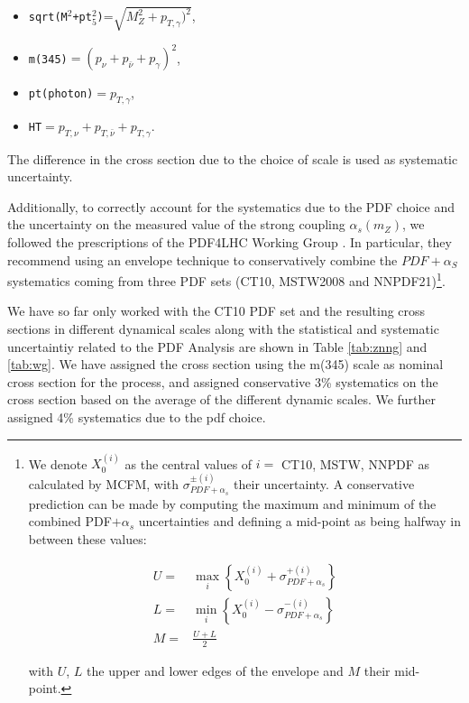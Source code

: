 \begin{itemize}
 \item \texttt{sqrt(M$^2$+pt$_5^2$)}=$\sqrt{M_Z^2+p_{T,\gamma})^2}$,
 \item \texttt{m(345)}$=(p_\nu + p_{\bar \nu} + p_{\gamma})^2$,
 \item  \texttt{pt(photon)}$=p_{T,\gamma}$,
 \item \texttt{HT}$=p_{T,\nu} + p_{T,\bar \nu} + p_{T,\gamma}$.
 \end{itemize}


The difference in the cross section due to the choice of scale is used as systematic uncertainty.

Additionally, to correctly account for the systematics due to the PDF choice and the uncertainty on the measured value of the strong coupling $\alpha_s(m_Z)$, we followed the prescriptions of the PDF4LHC Working Group \cite{bib:PDF4LHC}. In particular, they recommend using an envelope technique to conservatively combine the $PDF+\alpha_S$ systematics coming from three PDF sets (CT10, MSTW2008 and NNPDF21)\footnote{We denote $X_0^{(i)}$ as the central values of $i =$ CT10, MSTW, NNPDF as calculated by MCFM, with $\sigma^{\pm (i)}_{PDF+\alpha_s}$ their uncertainty. A conservative prediction can be made by computing the maximum and minimum of the combined PDF$+\alpha_s$ uncertainties and defining a mid-point as being halfway in between these values:

\begin{align}
U = & \max_{i} \left\lbrace X_0^{(i)}+\sigma^{+ (i)}_{PDF+\alpha_s}\right\rbrace \\L = & \min_{i} \left\lbrace X_0^{(i)}-\sigma^{- (i)}_{PDF+\alpha_s}\right\rbrace \\
M = & \frac{U+L}{2}
\end{align}

with $U$, $L$ the upper and lower edges of the envelope and $M$ their mid-point.}.

We have so far only worked with the CT10 PDF set and the resulting cross sections in different dynamical scales along with the statistical and systematic uncertaintiy related to the PDF Analysis are shown in Table \ref{tab:znng} and \ref{tab:wg}. We have assigned the cross section using the m(345) scale as nominal cross section for the process, and assigned conservative 3\% systematics on the cross section  based on the average of the different dynamic scales. We further assigned 4\% systematics due to the pdf choice.

